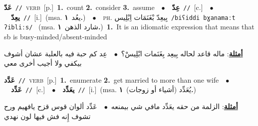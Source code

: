 \documentclass[10pt,a4paper,twoside]{article} %
\begin{document}
\begin{multicols}{2}
{\setlength\topsep{0pt}\textbf{\foreignlanguage{arabic}{عَدّ}}\ {\color{gray}\texttt{//}\color{black}}\ \textsc{verb}\ [p.]\ \textbf{1.}~count  \textbf{2.}~consider  \textbf{3.}~assume\ \ $\bullet$\ \ \setlength\topsep{0pt}\textbf{\foreignlanguage{arabic}{عِدّ}}\ {\color{gray}\texttt{//}\color{black}}\ [c.]\ \ $\bullet$\ \ \setlength\topsep{0pt}\textbf{\foreignlanguage{arabic}{يعِدّ}}\ {\color{gray}\texttt{//}\color{black}}\ [i.]\ \color{gray}(msa. \foreignlanguage{arabic}{يعُد}~\foreignlanguage{arabic}{\textbf{١.}})\color{black}\ \ $\bullet$\ \ \textsc{ph.} \color{gray} \foreignlanguage{arabic}{بِيعِدّ بْغَنَمَات اِبْلِيس}\color{black}\ {\color{gray}\texttt{/{\sffamily biʕiddi bɣanamaːt ʔibliːs}/}\color{black}}\ \color{gray} (msa. \foreignlanguage{arabic}{شارد الذهن}~\foreignlanguage{arabic}{\textbf{١.}})\color{black}\ \textbf{1.}~It is an idiomatic expression that means that sb is busy-minded/absent-minded\  \begin{flushright}\color{gray}\foreignlanguage{arabic}{\textbf{\underline{\foreignlanguage{arabic}{أمثلة}}}: ماله قاعد لحاله بِيعِد بِغَنَمات ابْلِيسْ؟\ $\bullet$\ \  عِد كم حبة فيه بالعلبة عشان أشوف بيكفي ولا أجيب أخرى معي}\end{flushright}\color{black}} \vspace{2mm}

{\setlength\topsep{0pt}\textbf{\foreignlanguage{arabic}{عَدَّد}}\ {\color{gray}\texttt{//}\color{black}}\ \textsc{verb}\ [p.]\ \textbf{1.}~enumerate  \textbf{2.}~get married to more than one wife\ \ $\bullet$\ \ \setlength\topsep{0pt}\textbf{\foreignlanguage{arabic}{عَدِّد}}\ {\color{gray}\texttt{//}\color{black}}\ [c.]\ \ $\bullet$\ \ \setlength\topsep{0pt}\textbf{\foreignlanguage{arabic}{يعَدِّد}}\ {\color{gray}\texttt{//}\color{black}}\ [i.]\ \color{gray}(msa. \foreignlanguage{arabic}{يُعَدِّد (أشياء أو زوجات)}~\foreignlanguage{arabic}{\textbf{١.}})\color{black}\  \begin{flushright}\color{gray}\foreignlanguage{arabic}{\textbf{\underline{\foreignlanguage{arabic}{أمثلة}}}: الزلمة من حقه يعَدِّد مافي شي بيمنعه\ $\bullet$\ \  عَدِّد ألوان قوس قزح يافهيم ورح تشوف إِنه فش فيها لون نهدي}\end{flushright}\color{black}} \vspace{2mm}


\end{multicols}
\end{document}
